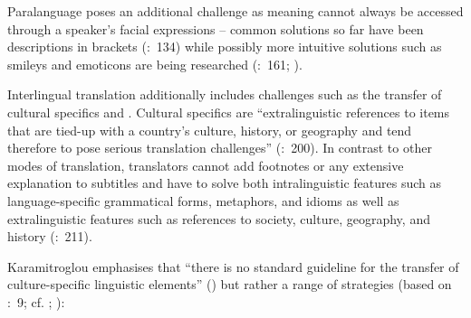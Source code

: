 Paralanguage poses an additional challenge as meaning cannot always be accessed through a speaker’s facial expressions – common solutions so far have been descriptions in brackets (\citealt{Jungst2010}:~134) while possibly more intuitive solutions such as smileys and emoticons are being researched (\citealt{neves2009}:~161; \citealt{secara2016}).

Interlingual translation additionally includes challenges such as the transfer of cultural specifics and . Cultural specifics are “extralinguistic references to items that are tied-up with a country’s culture, history, or geography and tend therefore to pose serious translation challenges” (\citealt{Diaz_cintas2007b}:~200). In contrast to other modes of translation, translators cannot add footnotes or any extensive explanation to subtitles and have to solve both intralinguistic features such as language-specific grammatical forms, metaphors, and idioms as well as extralinguistic features such as references to society, culture, geography, and history (\citealt{nedergaard-larsen1993}:~211).

 
Karamitroglou emphasises that “there is no standard guideline for the transfer of culture-specific linguistic elements” (\citeyear{Karamitroglou1998}) but rather a range of strategies (based on \citealt{pedersen2005}:~9; cf. \citealt{nedergaard-larsen1993}; \citealt{Diaz_cintas2007}):

